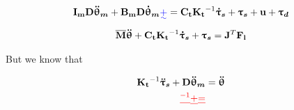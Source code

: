 \setlength{\arraycolsep}{0.0em}
\begin{eqnarray}
\label{eq:eq1}
\DIFdelbegin %
\DIFdelend \DIFaddbegin \vectm{I_m  D} \vects{\ddot{\uptheta}_m} \DIFaddend + \vectm{B_m  D}  \DIFdelbegin %
\DIFdelend \DIFaddbegin \vects{\dot{\uptheta}_m} \DIFadd{+}\DIFaddend = \DIFaddbegin \vectm{C_t} \DIFaddend \vectm{K_t}^{-1} \DIFdelbegin %
\DIFdelend \DIFaddbegin \vects{\dot{\uptau}_s} \DIFaddend + \DIFdelbegin %
\DIFdelend \DIFaddbegin \vects{\uptau_s} \DIFaddend + \DIFdelbegin %
\DIFdelend \DIFaddbegin \vect{u} \DIFaddend + \DIFdelbegin %
\DIFdelend \DIFaddbegin \vects{\uptau_d} \label{eq_first_formulation_ddthetam}
\DIFaddend \end{eqnarray}
\begin{eqnarray}
\label{eq:eq2}
\DIFdelbegin %
\DIFdelend \DIFaddbegin {\vectm{\overline{M}}} \vects{\ddot{\uptheta}}  \DIFaddend +  \DIFaddbegin \vectm{C_t} \DIFaddend \vectm{K_t}^{-1} \DIFdelbegin %
\DIFdelend \DIFaddbegin \vects{\dot{\uptau}_s} \DIFaddend + \DIFdelbegin %
\DIFdelend \DIFaddbegin \vects{\uptau_s} \DIFaddend = \vectm{J}^T  \DIFdelbegin %
\DIFdelend \DIFaddbegin \vect{F_{l}}
\DIFaddend \end{eqnarray}
\setlength{\arraycolsep}{5pt}

But we know that

\begin{equation}
\label{eq:thetadotand2dot}
\begin{aligned}
\vectm{K_t}^{-1}\DIFdelbegin %
\DIFdelend \DIFaddbegin \vects{\ddot{\uptau}_s} \DIFaddend + \vectm{D} \DIFdelbegin %
\DIFdelend \DIFaddbegin \vects{\ddot{\uptheta}_m}  \DIFaddend & =   \DIFdelbegin %
\DIFdelend \DIFaddbegin \vects{\ddot{\uptheta}}  \DIFaddend \\
\DIFdelbegin %
\DIFdel{^{-1}}%
\DIFdel{+ }%
\DIFdel{=    }%
\DIFdelend %
\end{aligned}
\end{equation}


